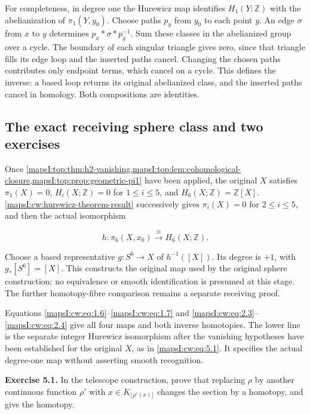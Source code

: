For completeness, in degree one the Hurewicz map identifies \(H_1(Y;\mathbb Z)\) with the abelianization of \(\pi_1(Y,y_0)\). Choose paths \(p_y\) from \(y_0\) to each point \(y\). An edge \(\sigma\) from \(x\) to \(y\) determines \(p_x*\sigma*p_y^{-1}\). Sum these classes in the abelianized group over a cycle. The boundary of each singular triangle gives zero, since that triangle fills its edge loop and the inserted paths cancel. Changing the chosen paths contributes only endpoint terms, which cancel on a cycle. This defines the inverse: a based loop returns its original abelianized class, and the inserted paths cancel in homology. Both compositions are identities.

\subsection{The exact receiving sphere class and two exercises}
\label{mapsI:cw:cw-hurewicz-exercises}

Once \cref{mapsI:top:thm:h2-vanishing,mapsI:top:lem:cohomological-closure,mapsI:top:prop:geometric-pi1} have been applied, the original \(X\) satisfies
\(\pi_1(X)=0\), \(H_i(X;\mathbb Z)=0\) for \(1\leq i\leq5\), and
\(H_6(X;\mathbb Z)=\mathbb Z[X]\).
\cref{mapsI:cw:hurewicz-theorem-result} successively gives \(\pi_i(X)=0\) for \(2\leq i\leq5\), and then the actual isomorphism

\begin{equation}
h:\pi_6(X,x_0)\xrightarrow{\;\cong\;}H_6(X;\mathbb Z).
\label{mapsI:cw:eq:5.1}
\end{equation}

Choose a based representative \(g:S^6\to X\) of \(h^{-1}([X])\). Its degree is \(+1\), with
\(g_*[S^6]=[X]\). This constructs the original map used by the original sphere construction; no equivalence or smooth identification is presumed at this stage. The further homotopy-fibre comparison remains a separate receiving proof.

Equations \eqref{mapsI:cw:eq:1.6}--\eqref{mapsI:cw:eq:1.7} and \eqref{mapsI:cw:eq:2.3}--\eqref{mapsI:cw:eq:2.4} give all four maps and both inverse homotopies. The lower line is the separate integer Hurewicz isomorphism after the vanishing hypotheses have been established for the original \(X\), as in \eqref{mapsI:cw:eq:5.1}. It specifies the actual degree-one map without asserting smooth recognition.

\textbf{Exercise 5.1.}\label{mapsI:cw:exercise:5.1} In the telescope construction, prove that replacing \(\rho\) by another continuous function \(\rho'\) with \(x\in K_{\lfloor\rho'(x)\rfloor}\) changes the section by a homotopy, and give the homotopy.

